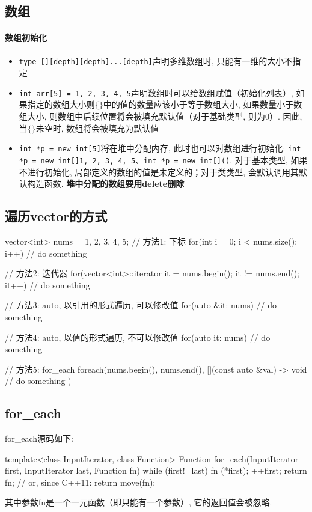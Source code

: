 \subsection{数组}
\paragraph{数组初始化}
\begin{itemize}
	\item \texttt{type [][depth][depth]...[depth]}声明多维数组时, 只能有一维的大小不指定
	\item \texttt{int arr[5] = {1, 2, 3, 4, 5}}声明数组时可以给数组赋值（初始化列表）, 如果指定的数组大小则$\{\}$中的值的数量应该小于等于数组大小, 如果数量小于数组大小, 则数组中后续位置将会被填充默认值（对于基础类型, 则为0）. 因此, 当$\{\}$未空时, 数组将会被填充为默认值
	\item \texttt{int *p = new int[5]}将在堆中分配内存, 此时也可以对数组进行初始化: \texttt{int *p = new int[]{1, 2, 3, 4, 5}}、\texttt{int *p = new int[]()}. 对于基本类型, 如果不进行初始化, 局部定义的数组的值是未定义的；对于类类型, 会默认调用其默认构造函数. \textbf{堆中分配的数组要用delete删除}
\end{itemize}

\subsection{遍历vector的方式}
\begin{cpp}
	vector<int> nums = {1, 2, 3, 4, 5};
	// 方法1: 下标
	for(int i = 0; i < nums.size(); i++){
		// do something
	}
	
	// 方法2: 迭代器
	for(vector<int>::iterator it = nums.begin(); it != nums.end(); it++){
		// do something
	}

	// 方法3: auto, 以引用的形式遍历, 可以修改值
	for(auto &it: nums){
		// do something 
	}

	// 方法4: auto, 以值的形式遍历, 不可以修改值
	for(auto it: nums){
		// do something
	}
	
	// 方法5: for_each
	foreach(nums.begin(), nums.end(),
			[](const auto &val) -> void { 
				// do something
			})
	
\end{cpp}

\subsection{for\_each}
for\_each源码如下: 
\begin{cpp}
	template<class InputIterator, class Function>
	Function for_each(InputIterator first, InputIterator last, Function fn)
	{
		while (first!=last) {
			fn (*first);
			++first;
		}
		return fn;      // or, since C++11: return move(fn);
	}
\end{cpp}
其中参数fn是一个一元函数（即只能有一个参数）, 它的返回值会被忽略. 

